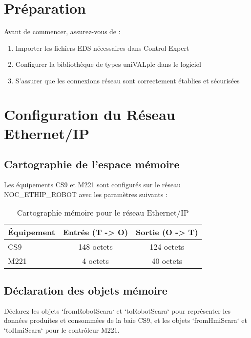 \documentclass{UPSTI_Document}
\begin{document}
\section{Préparation}
Avant de commencer, assurez-vous de :
\begin{enumerate}
    \item Importer les fichiers EDS nécessaires dans Control Expert
    \item Configurer la bibliothèque de types uniVALplc dans le logiciel
    \item S'assurer que les connexions réseau sont correctement établies et sécurisées
\end{enumerate}

\section{Configuration du Réseau Ethernet/IP}
\subsection{Cartographie de l'espace mémoire}
Les équipements CS9 et M221 sont configurés sur le réseau NOC\_ETHIP\_ROBOT avec les paramètres suivants :
\begin{table}[h]
    \centering
    \begin{tabular}{|l|c|c|}
        \hline
        Équipement & Entrée (T -> O) & Sortie (O -> T) \\
        \hline
        CS9 & 148 octets & 124 octets \\
        M221 & 4 octets & 40 octets \\
        \hline
    \end{tabular}
    \caption{Cartographie mémoire pour le réseau Ethernet/IP}
\end{table}

\subsection{Déclaration des objets mémoire}
Déclarez les objets `fromRobotScara` et `toRobotScara` pour représenter les données produites et consommées de la baie CS9, et les objets 
`fromHmiScara` et `toHmiScara` pour le contrôleur M221.
\end{document}
